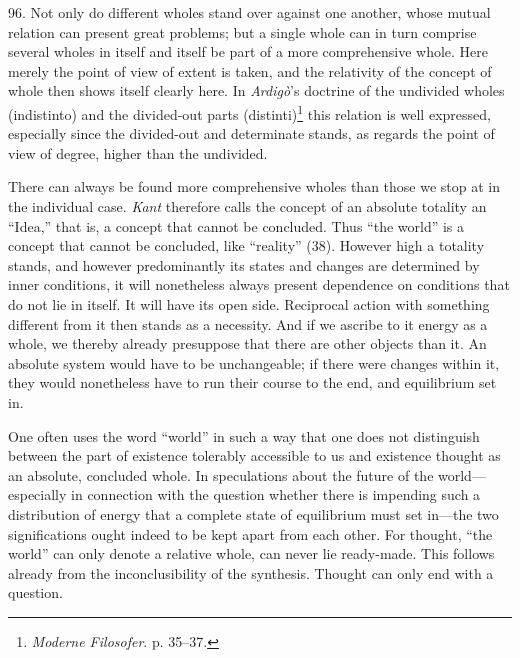 \documentclass[12pt,a4paper]{book}
\begin{document}
96. Not only do different wholes stand over against one another, whose mutual
relation can present great problems; but a single whole can in turn comprise
several wholes in itself and itself be part of a more comprehensive whole.
Here merely the point of view of extent is taken, and the relativity of the
concept of whole then shows itself clearly here. In \emph{Ardigò}'s doctrine
of the undivided wholes (indistinto) and the divided-out parts (distinti)\footnote{\emph{Moderne
Filosofer}. p. 35--37.} this relation is well expressed, especially since the
divided-out and determinate stands, as regards the point of view of degree,
higher than the undivided.

There can always be found more comprehensive wholes than those we stop at in
the individual case. \emph{Kant} therefore calls the concept of an absolute
totality an ``Idea,'' that is, a concept that cannot be concluded. Thus ``the
world'' is a concept that cannot be concluded, like ``reality'' (38). However
high a totality stands, and however predominantly its states and changes are
determined by inner conditions, it will nonetheless always present dependence
on conditions that do not lie in itself. It will have its open side.
Reciprocal action with something different from it then stands as a necessity.
And if we ascribe to it energy as a whole, we thereby already presuppose that
there are other objects than it. An absolute system would have to be
unchangeable; if there were changes within it, they would nonetheless have to
run their course to the end, and equilibrium set in.

One often uses the word ``world'' in such a way that one does not distinguish
between the part of existence tolerably accessible to us and existence thought
as an absolute, concluded whole. In speculations about the future of the
world---especially in connection with the question whether there is impending
such a distribution of energy that a complete state of equilibrium must set
in---the two significations ought indeed to be kept apart from each other. For
thought, ``the world'' can only denote a relative whole, can never lie
ready-made. This follows already from the inconclusibility of the synthesis.
Thought can only end with a question.
\end{document}
